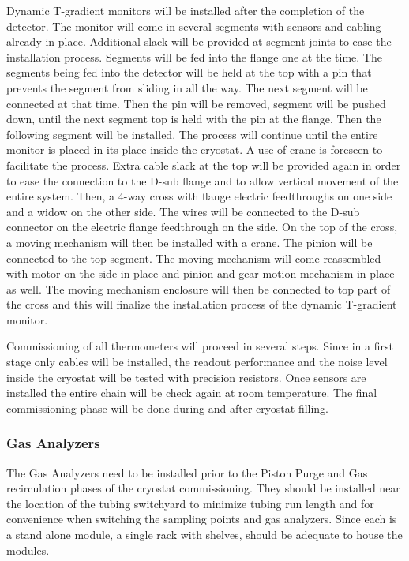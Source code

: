 Dynamic T-gradient monitors will be installed after the completion of the detector.
The monitor will come in several segments with sensors and cabling already
in place. Additional slack will be provided at segment joints to ease the
installation process. Segments will be fed into the flange one at the
time. The segments being fed into the detector will be held at the top
with a pin that prevents the segment from sliding in all the way. The next
segment will be connected at that time. Then the pin will be removed,
segment will be pushed down, until the next segment top is held with the
pin at the flange. Then the following segment will be installed. The
process will continue until the entire monitor is placed in its place
inside the cryostat. A use of crane is foreseen to facilitate the process.
Extra cable slack at the top will be provided again in order to ease  the
connection to the D-sub flange and to allow  vertical movement of the
entire system. Then,  a 4-way cross with flange electric feedthroughs on
one side and a widow on the other side. The wires will  be connected to
the D-sub connector on the electric flange feedthrough on the side. On the
top of the cross, a moving mechanism will then be installed with a crane.
The pinion will be connected to the top segment. The moving mechanism will
come reassembled with motor on the side in place and pinion and gear
motion mechanism in place as well. The moving mechanism enclosure  will
then be connected to top part of the cross and this will finalize the
installation process of the dynamic T-gradient monitor.

Commissioning of all thermometers will proceed in several steps. Since in a first stage only cables will be installed,
the readout performance and the noise level inside the cryostat will be
tested with precision resistors. Once sensors are installed the entire chain will be check again at room temperature.
The final commissioning phase will be done during and after cryostat filling.  


\subsubsection{Gas Analyzers}
\label{sec:fdgen-slow-cryo-install-ga}

The Gas Analyzers need to be installed prior to the Piston Purge and Gas recirculation phases of the cryostat commissioning. They should be installed near the location of the tubing switchyard to minimize tubing run length and for convenience when switching the sampling points and gas analyzers. Since each is a stand alone module, a single rack with shelves, should be adequate to house the modules.

